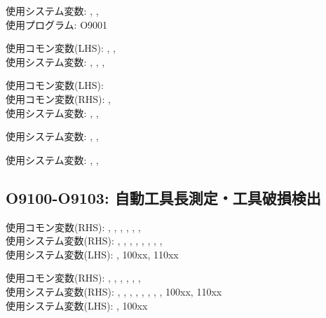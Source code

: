 \begin{hosoku}\small
使用システム変数: , , \\
使用プログラム: O9001
\end{hosoku}

\begin{hosoku}\small
使用コモン変数(LHS): , , \\
使用システム変数: , , , 
\end{hosoku}

\begin{hosoku}\small
使用コモン変数(LHS): \\
使用コモン変数(RHS): , \\
使用システム変数: , , 
\end{hosoku}

\begin{hosoku}\small
使用システム変数: , , 
\end{hosoku}

\begin{hosoku}\small
使用システム変数: , , 
\end{hosoku}

\subsection{O9100-O9103: 自動工具長測定・工具破損検出}
\begin{hosoku}\small
使用コモン変数(RHS): , , , , , , \\
使用システム変数(RHS): , , , , , , , , \\
使用システム変数(LHS): , \ttNum100xx, \ttNum110xx
\end{hosoku}

\begin{hosoku}\small
使用コモン変数(RHS): , , , , , , \\
使用システム変数(RHS): , , , , , , , , \ttNum100xx, \ttNum110xx\\
使用システム変数(LHS): , \ttNum100xx
\end{hosoku}

